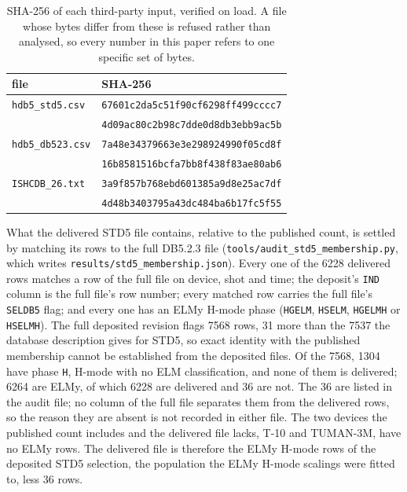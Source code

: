 \documentclass[12pt,letterpaper]{article}
\begin{document}
\begin{table}[!ht]
\centering
\scriptsize
\caption{SHA-256 of each third-party input, verified on load. A file whose bytes
differ from these is refused rather than analysed, so every number in this paper
refers to one specific set of bytes.}
\label{tab:fingerprints}
\begin{tabular}{ll}
\toprule
file & SHA-256 \\
\midrule
\texttt{hdb5\_std5.csv} & \texttt{67601c2da5c51f90cf6298ff499cccc7} \\
 & \texttt{4d09ac80c2b98c7dde0d8db3ebb9ac5b} \\[2pt]
\texttt{hdb5\_db523.csv} & \texttt{7a48e34379663e3e298924990f05cd8f} \\
 & \texttt{16b8581516bcfa7bb8f438f83ae80ab6} \\[2pt]
\texttt{ISHCDB\_26.txt} & \texttt{3a9f857b768ebd601385a9d8e25ac7df} \\
 & \texttt{4d48b3403795a43dc484ba6b17fc5f55} \\[2pt]
\bottomrule
\end{tabular}
\par\smallskip{}
\end{table}


\noindent What the delivered STD5 file contains, relative to the published
count, is settled by matching its rows to the full DB5.2.3 file
(\texttt{tools/audit\_std5\_membership.py}, which writes
\texttt{results/std5\_membership.json}). Every one of the 6228 delivered rows
matches a row of the full file on device, shot and time; the deposit's
\texttt{IND} column is the full file's row number; every matched row carries
the full file's \texttt{SELDB5} flag; and every one has an ELMy H-mode phase
(\texttt{HGELM}, \texttt{HSELM}, \texttt{HGELMH} or \texttt{HSELMH}). The
full deposited revision flags 7568 rows, 31 more than the 7537 the database
description gives for STD5, so exact identity with the published membership
cannot be established from the deposited files. Of the 7568, 1304 have phase
\texttt{H}, H-mode with no ELM
classification, and none of them is delivered; 6264 are ELMy, of which 6228
are delivered and 36 are not. The 36 are listed in the audit file; no column of
the full file separates them from the delivered rows, so the reason they are
absent is not recorded in either file. The two devices the published count
includes and the delivered file lacks, T-10 and TUMAN-3M, have no ELMy rows.
The delivered file is therefore the ELMy H-mode rows of the deposited STD5
selection, the population the ELMy H-mode scalings were fitted to, less 36
rows.
\end{document}
